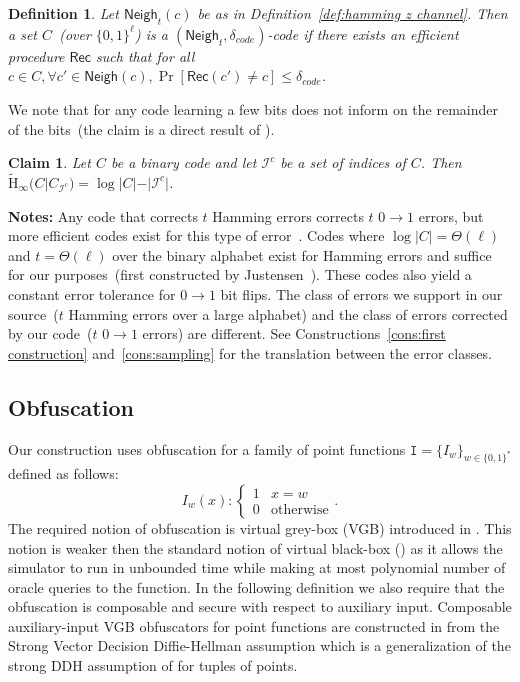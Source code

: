 \documentclass[11pt]{article}
\newcommand{\defref}[1]{\mbox{Definition~\ref{#1}}}
\newcommand{\class}[1]{{\ensuremath{\mathsf{#1}}}}
\newcommand{\rec}{\ensuremath{\class{Rec}}\xspace}
\newcommand{\zo}{\ensuremath{\{0, 1\}}}
\newcommand{\neigh}{\ensuremath{\class{Neigh}}\xspace}
\newcommand{\Hav}{\tilde{\mathrm{H}}_\infty}
\newtheorem{definition}[theorem]{Definition}
\newtheorem{claim}[theorem]{Claim}
\begin{document}
\begin{definition}
Let $\neigh_t(c)$ be as in \defref{def:hamming z channel}.  Then a set $C$~(over $\zo^\ell$) is a $(\neigh_t, \delta_{code})$-code if there exists an efficient procedure $\rec$ such that for all $c\in C, \forall c'\in \neigh(c), \Pr[\rec(c') \neq c] \leq \delta_{code}$.
\end{definition}

We note that for any code learning a few bits does not inform on the remainder of the bits~(the claim is a direct result of \cite[Lemma 2.2b]{DBLP:journals/siamcomp/DodisORS08}).

\begin{claim}
\label{cl:many locations ent}
Let $C$ be a binary code and let $\mathcal{I}^c$ be a set of indices of $C$.  Then $\Hav(C | C_{\mathcal{I}^c}) = \log |C| - |\mathcal{I}^c|$.
\end{claim}

\textbf{Notes:} 
Any code that corrects $t$ Hamming errors corrects $t$ $0\rightarrow 1$ errors, but more efficient codes  exist for this type of error~\cite{tallini2002capacity}.
 Codes where $\log |C| = \Theta(\ell)$ and $t = \Theta(\ell)$ over the binary alphabet exist for Hamming errors and suffice for our purposes~(first constructed by Justensen~\cite{justesen1972class}).  These codes also yield a constant error tolerance for $0\rightarrow 1$ bit flips.
The class of errors we support in our source~($t$ Hamming errors over a large alphabet) and the class of errors corrected by our code~($t$ $0\rightarrow 1$ errors) are different.  See Constructions~\ref{cons:first construction} and~\ref{cons:sampling} for the translation between the error classes.

\subsection{Obfuscation}
Our construction uses obfuscation for a family of point functions $\mathtt{I} = \{I_w\}_{w \in \zo^*}$ defined as follows:
\[
I_w(x):\begin{cases} 1 & x=w\\0 & \text{otherwise}\end{cases}.
\]
The required notion of obfuscation is virtual grey-box (VGB) introduced in \cite{bitansky2010strong}. This notion is weaker then the standard notion of virtual black-box (\cite{barak2001possibility}) as it allows the simulator to run in unbounded time while making at most polynomial number of oracle queries to the function. In the following definition we also require that the obfuscation is composable and secure with respect to auxiliary input. Composable auxiliary-input VGB obfuscators for point functions are constructed in \cite[Theorem 6.1]{bitansky2010strong} from the Strong Vector Decision Diffie-Hellman assumption which is a generalization of the strong DDH assumption of \cite{canetti1997towards} for tuples of points.
\end{document}
